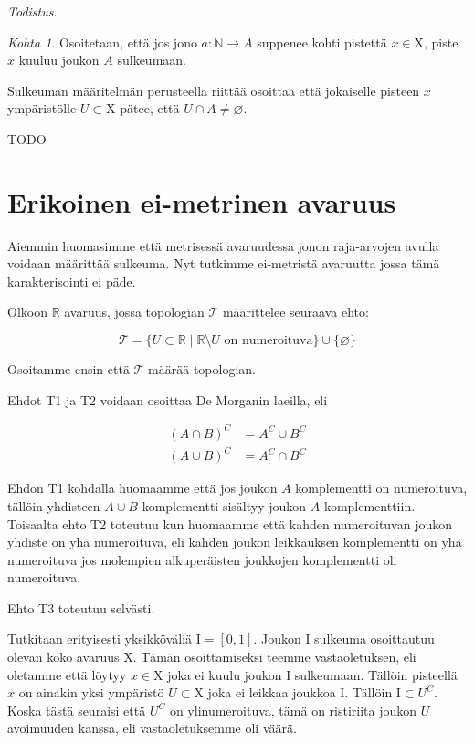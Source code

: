 \documentclass[12pt,a4paper,leqno]{report}
\newcommand{\R}{\mathbb{R}}
\newcommand{\N}{\mathbb{N}}
\newcommand{\X}{\mathrm{X}}
\newcommand{\T}{\mathcal{T}}
\newcommand{\I}{\mathrm{I}}
\theoremstyle{plain}
\theoremstyle{definition}
\theoremstyle{remark}
\begin{document}
\noindent\emph{Todistus}.

\emph{Kohta 1}. Osoitetaan, että jos jono $a : \N \to A$ suppenee kohti pistettä $x \in \X$, piste $x$ kuuluu joukon $A$ sulkeumaan.

Sulkeuman määritelmän perusteella riittää osoittaa että jokaiselle pisteen $x$ ympäristölle $U \subset \X$ pätee, että $U \cap A \not= \varnothing$.

TODO

\chapter{Erikoinen ei-metrinen avaruus}
Aiemmin huomasimme että metrisessä avaruudessa jonon raja-arvojen avulla voidaan määrittää sulkeuma. Nyt tutkimme ei-metristä avaruutta jossa tämä karakterisointi ei päde.

Olkoon $\R$ avaruus, jossa topologian $\T$ määrittelee seuraava ehto:

\begin{equation}
\T = \{U \subset \R \mid \R \setminus U \text{ on numeroituva} \} \cup \{ \varnothing \}
\end{equation}

Osoitamme ensin että $\T$ määrää topologian.

Ehdot T1 ja T2 voidaan osoittaa De Morganin laeilla, eli 

\begin{align}
(A \cap B)^C &= A^C \cup B^C \\
(A \cup B)^C &= A^C \cap B^C
\end{align}

Ehdon T1 kohdalla huomaamme että jos joukon $A$ komplementti on numeroituva, tällöin yhdisteen $A \cup B$ komplementti sisältyy joukon $A$ komplementtiin. Toisaalta ehto T2 toteutuu kun huomaamme että kahden numeroituvan joukon yhdiste on yhä numeroituva, eli kahden joukon leikkauksen komplementti on yhä numeroituva jos molempien alkuperäisten joukkojen komplementti oli numeroituva.

Ehto T3 toteutuu selvästi.

Tutkitaan erityisesti yksikköväliä $\I = [0,1]$. Joukon $\I$ sulkeuma osoittautuu olevan koko avaruus $\X$. Tämän osoittamiseksi teemme vastaoletuksen, eli oletamme että löytyy $x \in \X$ joka ei kuulu joukon $\I$ sulkeumaan. Tällöin pisteellä $x$ on ainakin yksi ympäristö $U \subset \X$ joka ei leikkaa joukkoa $\I$. Tällöin $\I \subset U^C$. Koska tästä seuraisi että $U^C$ on ylinumeroituva, tämä on ristiriita joukon $U$ avoimuuden kanssa, eli vastaoletuksemme oli väärä.
\end{document}
